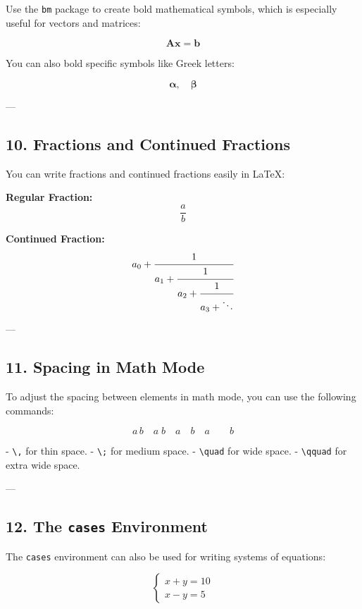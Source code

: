 \documentclass{article}
\begin{document}
Use the \texttt{bm} package to create bold mathematical symbols, which is especially useful for vectors and matrices:

\[
\bm{A} \bm{x} = \bm{b}
\]

You can also bold specific symbols like Greek letters:

\[
\bm{\alpha}, \quad \bm{\beta}
\]

---

\subsection*{10. Fractions and Continued Fractions}

You can write fractions and continued fractions easily in LaTeX:

\textbf{Regular Fraction:}
\[
\frac{a}{b}
\]

\textbf{Continued Fraction:}
\[
a_0 + \cfrac{1}{a_1 + \cfrac{1}{a_2 + \cfrac{1}{a_3 + \ddots}}}
\]

---

\subsection*{11. Spacing in Math Mode}

To adjust the spacing between elements in math mode, you can use the following commands:

\[
a \, b \quad a \; b \quad a \quad b \quad a \qquad b
\]

- \texttt{\textbackslash,} for thin space.
- \texttt{\textbackslash;} for medium space.
- \texttt{\textbackslash quad} for wide space.
- \texttt{\textbackslash qquad} for extra wide space.

---

\subsection*{12. The \texttt{cases} Environment}

The \texttt{cases} environment can also be used for writing systems of equations:

\[
\begin{cases}
    x + y = 10 \\
    x - y = 5
\end{cases}
\]
\end{document}
